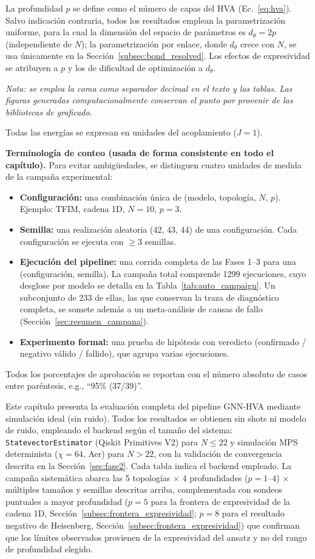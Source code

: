 \documentclass[11pt,a4paper,spanish]{book}
\begin{document}
La profundidad $p$ se define como el número de capas del HVA (Ec.~\ref{eq:hva}). Salvo indicación contraria, todos los resultados emplean la parametrización uniforme, para la cual la dimensión del espacio de parámetros es $d_\theta = 2p$ (independiente de $N$); la parametrización por enlace, donde $d_\theta$ crece con $N$, se usa únicamente en la Sección~\ref{subsec:bond_resolved}. Los efectos de expresividad se atribuyen a $p$ y los de dificultad de optimización a $d_\theta$.

\noindent\textit{Nota: se emplea la coma como separador decimal en el texto y las tablas. Las figuras generadas computacionalmente conservan el punto por provenir de las bibliotecas de graficado.}

\noindent Todas las energías se expresan en unidades del acoplamiento ($J = 1$).

\noindent\textbf{Terminología de conteo (usada de forma consistente en todo el capítulo).} Para evitar ambigüedades, se distinguen cuatro unidades de medida de la campaña experimental:
\begin{itemize}
    \item \textbf{Configuración:} una combinación única de (modelo, topología, $N$, $p$). Ejemplo: TFIM, cadena 1D, $N = 10$, $p = 3$.
    \item \textbf{Semilla:} una realización aleatoria (42, 43, 44) de una configuración. Cada configuración se ejecuta con $\geq 3$ semillas.
    \item \textbf{Ejecución del pipeline:} una corrida completa de las Fases 1--3 para una (configuración, semilla). La campaña total comprende 1299 ejecuciones, cuyo desglose por modelo se detalla en la Tabla~\ref{tab:auto_campaign}. Un subconjunto de 233 de ellas, las que conservan la traza de diagnóstico completa, se somete además a un meta-análisis de causas de fallo (Sección~\ref{sec:resumen_campana}).
    \item \textbf{Experimento formal:} una prueba de hipótesis con veredicto (confirmado / negativo válido / fallido), que agrupa varias ejecuciones.
\end{itemize}
\noindent Todos los porcentajes de aprobación se reportan con el número absoluto de casos entre paréntesis, e.g., ``95\% (37/39)''.

Este capítulo presenta la evaluación completa del pipeline GNN-HVA mediante simulación ideal (sin ruido). Todos los resultados se obtienen sin shots ni modelo de ruido, empleando el backend según el tamaño del sistema: \texttt{StatevectorEstimator} (Qiskit Primitives V2) para $N \leq 22$ y simulación MPS determinista ($\chi = 64$, Aer) para $N > 22$, con la validación de convergencia descrita en la Sección~\ref{sec:fase2}. Cada tabla indica el backend empleado. La campaña sistemática abarca las 5 topologías $\times$ 4 profundidades ($p = 1$--$4$) $\times$ múltiples tamaños y semillas descritas arriba, complementada con sondeos puntuales a mayor profundidad ($p = 5$ para la frontera de expresividad de la cadena 1D, Sección~\ref{subsec:frontera_expresividad}; $p = 8$ para el resultado negativo de Heisenberg, Sección~\ref{subsec:frontera_expresividad}) que confirman que los límites observados provienen de la expresividad del ansatz y no del rango de profundidad elegido.
\end{document}
